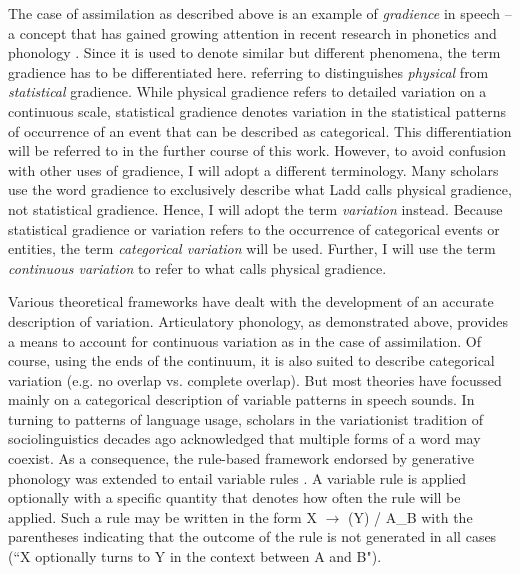 The case of assimilation as described above is an example of \emph{gradience} in speech -- a concept that has gained growing attention in recent research in phonetics and phonology \citep{Cohn2006}. Since it is used to denote similar but different phenomena, the term gradience has to be differentiated here. \cite{Ladd2014} referring to \cite{Bolinger1961} distinguishes \emph{physical} from \emph{statistical} gradience. While physical gradience refers to detailed variation on a continuous scale, statistical gradience denotes variation in the statistical patterns of occurrence of an event that can be described as categorical. This differentiation will be referred to in the further course of this work. However, to avoid confusion with other uses of gradience, I will adopt a different terminology. Many scholars use the word gradience to exclusively describe what Ladd calls physical gradience, not statistical gradience. Hence, I will adopt the term \emph{variation} instead. Because statistical gradience or variation refers to the occurrence of categorical events or entities, the term \emph{categorical variation} will be used. Further, I will use the term \emph{continuous variation} to refer to what \cite{Ladd2014} calls physical gradience. 

Various theoretical frameworks have dealt with the development of an accurate description of variation. Articulatory phonology, as demonstrated above, provides a means to account for continuous variation as in the case of assimilation. Of course, using the ends of the continuum, it is also suited to describe categorical variation (e.g. no overlap vs. complete overlap). But most theories have focussed mainly on a categorical description of variable patterns in speech sounds. In turning to patterns of language usage, scholars in the variationist tradition of sociolinguistics decades ago acknowledged that multiple forms of a word may coexist. As a consequence, the rule-based framework endorsed by generative phonology was extended to entail variable rules \citep{Labov1969,CedergrenSankoff1974,Anttila2007}. A variable rule is applied optionally with a specific quantity that denotes how often the rule will be applied. Such a rule may be written in the form X $\rightarrow$ (Y) / A\_B with the parentheses indicating that the outcome of the rule is not generated in all cases (``X optionally turns to Y in the context between A and B").

